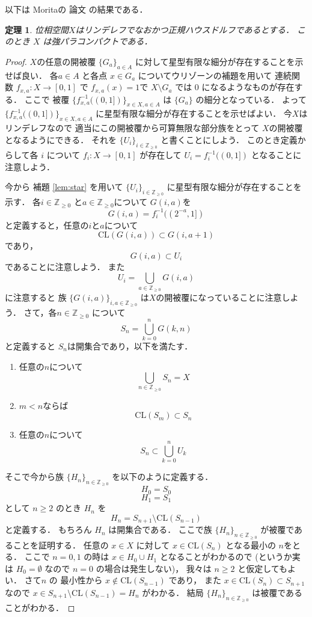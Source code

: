 \documentclass[leqno, a4paper, 12pt]{jsarticle}
\newtheorem{thm}{定理}
\newcommand{\zz}{\mathbb{Z}}
\newcommand{\cl}{\mathrm{CL}}
\begin{document}
以下は
Moritaの
論文
\cite[Theorem 3]{MR0026803}
の結果である．

\begin{thm}\label{thm:moritastar}
位相空間$X$はリンデレフでなおかつ正規ハウスドルフであるとする．
このとき
$X$
は強パラコンパクトである．
\end{thm}
\begin{proof}
$X$の任意の開被覆
$\{G_{a}\}_{a\in A}$
に対して星型有限な細分が存在することを示せば良い．
各$a\in A$
と各点
$x\in G_{a}$
についてウリゾーンの補題を用いて
連続関数
$f_{x,a}\colon X\to [0, 1]$
で
$f_{x,a}(x)=1$で
$X\setminus G_{a}$
では
$0$
になるようなものが存在する．
ここで
被覆
$\{f_{x, a}^{-1}((0, 1])\}_{x\in X, a\in A}$
は
$\{G_{a}\}$
の細分となっている．
よって
$\{f_{x, a}^{-1}((0, 1])\}_{x\in X, a\in A}$
に星型有限な細分が存在することを示せばよい．
今$X$はリンデレフなので
適当にこの開被覆から可算無限な部分族をとって
$X$の開被覆となるようにできる．
それを
$\{U_{i}\}_{i\in \zz_{\ge 0}}$
と書くことにしよう．
このとき定義からして各
$i$
について
$f_{i}\colon X\to [0, 1]$
が存在して
$U_{i}=f_{i}^{-1}((0, 1])$
となることに
注意しよう．

今から
補題
\ref{lem:star}
を用いて
$\{U_{i}\}_{i\in \zz_{\ge 0}}$
に星型有限な細分が存在することを示す．
各$i\in \zz_{\ge 0}$
と$a\in \zz_{\ge 0}$について
$G(i, a)$を
\[
G(i, a)=f_{i}^{-1}((2^{-a}, 1])
\]
と定義すると，任意の$i$と$a$について
\[
\cl(G(i, a))\subset G(i, a+1)
\]
であり，
\[
G(i, a)\subset U_{i}
\]
であることに注意しよう．
また
\[
U_{i}=\bigcup_{a\in \zz_{\ge 0}}G(i, a)
\]
に注意すると
族
$\{G(i, a)\}_{i, a\in \zz_{\ge 0}}$
は$X$の開被覆になっていることに注意しよう．
さて，各$n\in \zz_{\ge 0}$
について
\[
S_{n}=\bigcup_{k=0}^{n}G(k, n)
\]
と定義すると
$S_{n}$は開集合であり，以下を満たす．
\begin{enumerate}[label=\textup(\arabic*)]
\item
任意の$n$について
\[
\bigcup_{n\in \zz_{\ge 0}}S_{n}=X
\]
\item
$m<n$ならば
\[
\cl(S_{m})\subset S_{n}
\]
\item 
任意の$n$について
\[
S_{n}\subset \bigcup_{k=0}^{n}U_{k}
\]
\end{enumerate}
そこで今から族
$\{H_{n}\}_{n\in \zz_{\ge 0}}$
を以下のように定義する．
\[
H_{0}=S_{0}
\]
\[
H_{1}=S_{1}
\]
として
$n\ge 2$
のとき
$H_{n}$
を
\[
H_{n}=S_{n+1}\setminus \cl(S_{n-1})
\]
と定義する．
もちろん
$H_{n}$
は開集合である．
ここで族
$\{H_{n}\}_{n\in \zz_{\ge 0}}$
が被覆であることを証明する．
任意の
$x\in X$
に対して
$x\in \cl(S_{n})$
となる最小の
$n$をとる．
ここで
$n=0, 1$
の時は
$x\in H_{0}\cup H_{1}$
となることがわかるので
(というか実は
$H_{0}=\emptyset$
なので
$n=0$
の場合は発生しない)，
我々は
$n\ge 2$
と仮定してもよい．
さて$n$
の
最小性から
$x\not\in \cl(S_{n-1})$
であり，
また
$x\in \cl(S_{n})\subset S_{n+1}$
なので
$x\in S_{n+1}\setminus \cl(S_{n-1})=H_{n}$
がわかる．
結局
$\{H_{n}\}_{n\in \zz_{\ge 0}}$
は被覆であることがわかる．


\end{proof}
\end{document}
